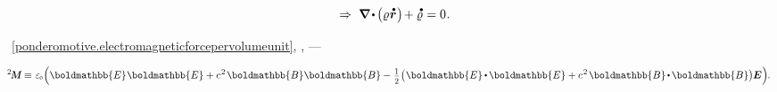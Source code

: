 \nopagebreak\vspace{-0.1em}\begin{equation}\label{continuity.balanceofelectriccharge}
\hspace*{1em}\Rightarrow\hspace{.7ex}
\boldnabla \hspace{-0.15ex} \dotp \hspace{-0.15ex} \bigl( \chargedensity \hspace{.1ex} \mathdotabove{\bm{r}} \hspace{.1ex} \bigr) \hspace{-0.3ex} + \mathdotabove{\chargedensity} \hspace{.1ex} = 0
\hspace{.1ex} .
\vspace{-0.5em}\end{equation}


 ~\eqref{ponderomotive.electromagneticforcepervolumeunit},   , \:---  \href{https://en.wikipedia.org/wiki/Maxwell_stress_tensor}{ }

\nopagebreak\en{\vspace{-0.1em}}\ru{\vspace{-0.25em}}\begin{equation}\label{maxwellstresstensor:definition}
\maxwellstress \equiv \hspace{.12ex}
\vacuumpermittivity \hspace{-0.33ex} \left(
\boldmathbb{E} \hspace{.1ex} \boldmathbb{E} + c^{\hspace{.16ex}2} \hspace{.22ex} \boldmathbb{B} \boldmathbb{B}
- \hspace{.1ex} \smalldisplaystyleonehalf \hspace{.1ex} \bigl( \hspace{.1ex} \boldmathbb{E} \hspace{-0.1ex} \dotp \hspace{-0.15ex} \boldmathbb{E} + c^{\hspace{.16ex}2} \hspace{.22ex} \boldmathbb{B} \hspace{-0.2ex} \dotp \hspace{-0.16ex} \boldmathbb{B} \bigr) \hspace{-0.06ex} \bm{E} \hspace{.05ex}
\right) \hspace{-0.22em} .
\end{equation}


